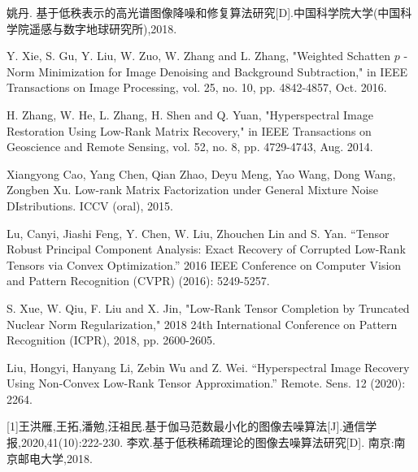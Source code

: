 \documentclass[12pt, a4paper]{article}
\begin{document}
\begin{thebibliography}{99}
姚丹. 基于低秩表示的高光谱图像降噪和修复算法研究[D].中国科学院大学(中国科学院遥感与数字地球研究所),2018.
		
Y. Xie, S. Gu, Y. Liu, W. Zuo, W. Zhang and L. Zhang, "Weighted Schatten  $p$ -Norm Minimization for Image Denoising and Background Subtraction," in IEEE Transactions on Image Processing, vol. 25, no. 10, pp. 4842-4857, Oct. 2016.%
		
H. Zhang, W. He, L. Zhang, H. Shen and Q. Yuan, "Hyperspectral Image Restoration Using Low-Rank Matrix Recovery," in IEEE Transactions on Geoscience and Remote Sensing, vol. 52, no. 8, pp. 4729-4743, Aug. 2014.%
		
Xiangyong Cao, Yang Chen, Qian Zhao, Deyu Meng, Yao Wang, Dong Wang, Zongben Xu. Low-rank Matrix Factorization under General Mixture Noise DIstributions. ICCV (oral), 2015.
		
Lu, Canyi, Jiashi Feng, Y. Chen, W. Liu, Zhouchen Lin and S. Yan. “Tensor Robust Principal Component Analysis: Exact Recovery of Corrupted Low-Rank Tensors via Convex Optimization.” 2016 IEEE Conference on Computer Vision and Pattern Recognition (CVPR) (2016): 5249-5257.
		
S. Xue, W. Qiu, F. Liu and X. Jin, "Low-Rank Tensor Completion by Truncated Nuclear Norm Regularization," 2018 24th International Conference on Pattern Recognition (ICPR), 2018, pp. 2600-2605.%
		
Liu, Hongyi, Hanyang Li, Zebin Wu and Z. Wei. “Hyperspectral Image Recovery Using Non-Convex Low-Rank Tensor Approximation.” Remote. Sens. 12 (2020): 2264.
		
[1]王洪雁,王拓,潘勉,汪祖民.基于伽马范数最小化的图像去噪算法[J].通信学报,2020,41(10):222-230.
李欢.基于低秩稀疏理论的图像去噪算法研究[D]. 南京:南京邮电大学,2018.
\end{thebibliography}
	
\end{document}
